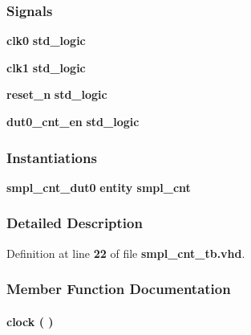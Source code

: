 \subsubsection*{Signals}
 \begin{DoxyCompactItemize}
\item 
{\bf clk0} {\bfseries \textcolor{comment}{std\+\_\+logic}\textcolor{vhdlchar}{ }} 
\item 
{\bf clk1} {\bfseries \textcolor{comment}{std\+\_\+logic}\textcolor{vhdlchar}{ }} 
\item 
{\bf reset\+\_\+n} {\bfseries \textcolor{comment}{std\+\_\+logic}\textcolor{vhdlchar}{ }} 
\item 
{\bf dut0\+\_\+cnt\+\_\+en} {\bfseries \textcolor{comment}{std\+\_\+logic}\textcolor{vhdlchar}{ }} 
\end{DoxyCompactItemize}
\subsubsection*{Instantiations}
 \begin{DoxyCompactItemize}
\item 
{\bf smpl\+\_\+cnt\+\_\+dut0}  {\bfseries entity smpl\+\_\+cnt}   
\end{DoxyCompactItemize}


\subsubsection{Detailed Description}


Definition at line {\bf 22} of file {\bf smpl\+\_\+cnt\+\_\+tb.\+vhd}.



\subsubsection{Member Function Documentation}
\paragraph[{clock}]{\setlength{\rightskip}{0pt plus 5cm} {\bfseries \textcolor{vhdlchar}{ }} clock ( ) \hspace{0.3cm}{\ttfamily [Process]}}\label{classsmpl__cnt__tb_1_1tb__behave_af761a67e9d7ce9e23381088b6f2ae893}


